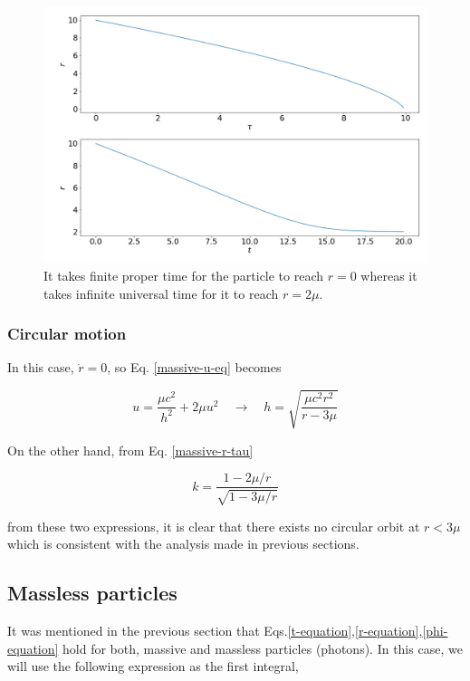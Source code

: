\documentclass[letterpaper,11pt,onecolumn]{article}
\begin{document}
\begin{figure}[h!]
    \centering
    \includegraphics[width=0.8\linewidth]{Report/Images/2_radial_motion.png}
    \caption{It takes finite proper time for the particle to reach $r=0$ whereas it takes infinite universal time for it to reach $r = 2\mu$.}
    \label{fig:massive-ff}
\end{figure}


\subsubsection{Circular motion}


In this case, $\dot{r} = 0$, so Eq. \ref{massive-u-eq} becomes

\begin{equation}
    u = \frac{\mu c^2}{h^2} + 2 \mu u^2 \quad \longrightarrow \quad h = \sqrt{\frac{\mu c^2 r^2}{r-3 \mu}} 
\end{equation}
 
On the other hand, from Eq. \ref{massive-r-tau}

\begin{equation}
    k = \frac{1-2\mu/r}{\sqrt{1-3\mu/r}}
\end{equation}
 
 from these two expressions, it is clear that there exists no circular orbit at $r<3\mu$ which is consistent with the analysis made in previous sections. 
 
\subsection{Massless particles}

It was mentioned in the previous section that Eqs.\ref{t-equation},\ref{r-equation},\ref{phi-equation} hold for both, massive and massless particles (photons). In this case, we will use the following expression as the first integral,
\end{document}
